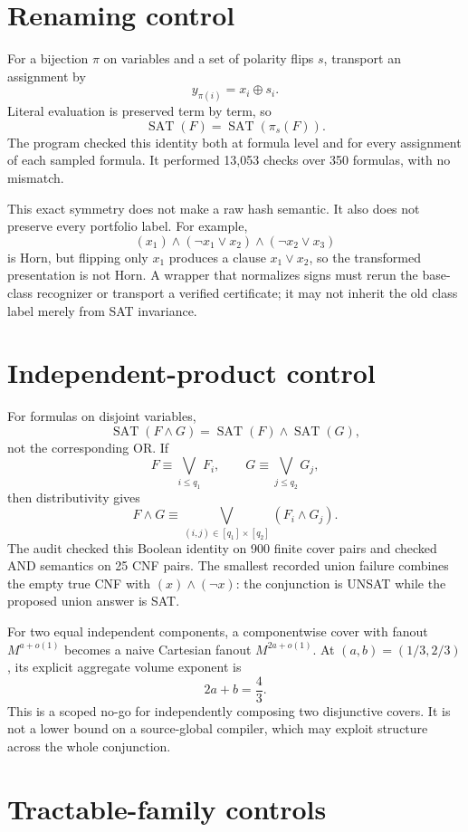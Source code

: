 \documentclass[11pt]{article}
\newcommand{\SAT}{\operatorname{SAT}}
\begin{document}
\section{Renaming control}

For a bijection $\pi$ on variables and a set of polarity flips $s$, transport
an assignment by
\[
 y_{\pi(i)}=x_i\oplus s_i.
\]
Literal evaluation is preserved term by term, so
\[
 \SAT(F)=\SAT(\pi_s(F)).
\]
The program checked this identity both at formula level and for every
assignment of each sampled formula.  It performed 13,053 checks over 350
formulas, with no mismatch.

This exact symmetry does not make a raw hash semantic.  It also does not
preserve every portfolio label.  For example,
\[
 (x_1)\wedge(\neg x_1\vee x_2)\wedge(\neg x_2\vee x_3)
\]
is Horn, but flipping only $x_1$ produces a clause
$x_1\vee x_2$, so the transformed presentation is not Horn.  A wrapper that
normalizes signs must rerun the base-class recognizer or transport a verified
certificate; it may not inherit the old class label merely from SAT
invariance.

\section{Independent-product control}

For formulas on disjoint variables,
\[
 \SAT(F\wedge G)=\SAT(F)\wedge\SAT(G),
\]
not the corresponding OR.  If
\[
 F\equiv\bigvee_{i\le q_1}F_i,
 \qquad
 G\equiv\bigvee_{j\le q_2}G_j,
\]
then distributivity gives
\[
 F\wedge G\equiv
 \bigvee_{(i,j)\in[q_1]\times[q_2]}(F_i\wedge G_j).
\]
The audit checked this Boolean identity on 900 finite cover pairs and checked
AND semantics on 25 CNF pairs.  The smallest recorded union failure combines
the empty true CNF with $(x)\wedge(\neg x)$: the conjunction is UNSAT while
the proposed union answer is SAT.

For two equal independent components, a componentwise cover with fanout
$M^{a+o(1)}$ becomes a naive Cartesian fanout $M^{2a+o(1)}$.  At
$(a,b)=(1/3,2/3)$, its explicit aggregate volume exponent is
\[
        2a+b=\frac43.
\]
This is a scoped no-go for independently composing two disjunctive covers.
It is not a lower bound on a source-global compiler, which may exploit
structure across the whole conjunction.

\section{Tractable-family controls}
\end{document}
